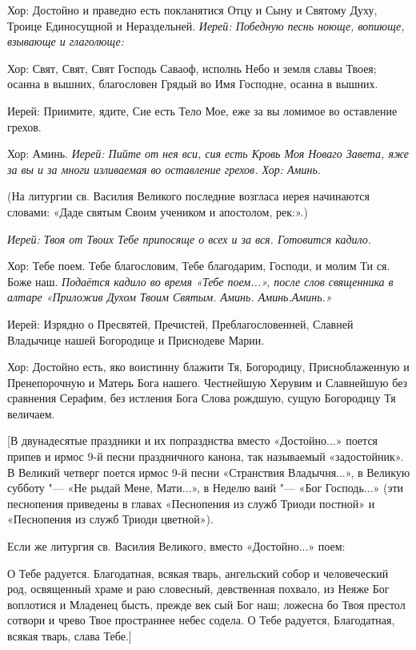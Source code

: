   Хор:\normalfont{} Достойно и праведно есть покланятися Отцу и Сыну и Святому Духу, Троице Единосущной и Нераздельней. \itshape  Иерей:\normalfont{} Победную песнь ноюще, вопиюще, взывающе и глаголюще: \itshape 


  Хор:\normalfont{} Свят, Свят, Свят Господь Саваоф, исполнь Небо и земля славы Твоея; осанна в вышних, благословен Грядый во Имя Господне, осанна в вышних. \itshape 


  Иерей:\normalfont{} Приимите, ядите, Сие есть Тело Мое, еже за вы ломимое во оставление грехов. \itshape 


  Хор:\normalfont{} Аминь. \itshape  Иерей:\normalfont{} Пийте от нея вси, сия есть Кровь Моя Новаго Завета, яже за вы и за многи изливаемая во оставление грехов. \itshape  Хор:\normalfont{} Аминь. 


  (На литургии св. Василия Великого последние возгласа иерея начинаются словами: «Даде святым Своим учеником и апостолом, рек:».)


\itshape  Иерей:\normalfont{} Твоя от Твоих Тебе припосяще о всех и за вся. \itshape  Готовится кадило\normalfont{}. \itshape 


Хор:\normalfont{} Тебе поем. Тебе благословим, Тебе благодарим, Господи, и молим Ти ся. Боже наш. \itshape  Подаётся кадило во время «Тебе поем...», после слов священника в алтаре «Приложив Духом Твоим Святым. Аминь. Аминь.Аминь.\normalfont{}»  \itshape 


  Иерей:\normalfont{} Изрядно о Пресвятей, Пречистей, Преблагословенней, Славней Владычице нашей Богородице и Приснодеве Марии. \itshape 


Хор:\normalfont{} Достойно есть, яко воистинну блажити Тя, Богородицу, Присноблаженную и Пренепорочную и Матерь Бога нашего. Честнейшую Херувим и Славнейшую без сравнения Серафим, без истления Бога Слова рождшую, сущую Богородицу Тя величаем. 


 [В двунадесятые праздники и их попразднства вместо «Достойно...» поется припев и ирмос 9-й песни праздничного канона, так называемый «задостойник». В Великий четверг поется ирмос 9-й песни «Странствия Владычня...», в Великую субботу "--- «Не рыдай Мене, Мати...», в Неделю ваий "--- «Бог Господь...» (эти песнопения приведены в главах «Песнопения из служб Триоди постной» и «Песнопения из служб Триоди цветной»).


 Если же литургия св. Василия Великого, вместо «Достойно...» поем: 


      О Тебе радуется. Благодатная, всякая тварь, ангельский собор и человеческий род, освященный храме и раю словесный, девственная похвало, из Неяже Бог воплотися и Младенец бысть, прежде век сый Бог наш; ложесна бо Твоя престол сотвори и чрево Твое пространнее небес содела. О Тебе радуется, Благодатная, всякая тварь, слава Тебе.]



